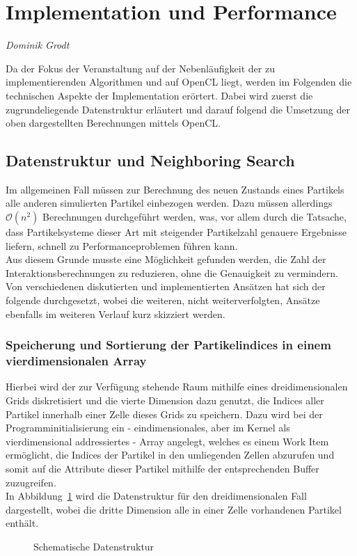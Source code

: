 \section{Implementation und Performance}


\begin{center}
\emph{{\small Dominik Grodt}}
\end{center}

\bigskip

Da der Fokus der Veranstaltung auf der Nebenläufigkeit der zu implementierenden Algorithmen und auf OpenCL liegt, werden im Folgenden die technischen Aspekte der Implementation erörtert. Dabei wird zuerst die zugrundeliegende Datenstruktur erläutert und darauf folgend die Umsetzung der oben dargestellten Berechnungen mittels OpenCL.

\subsection{Datenstruktur und Neighboring Search}
Im allgemeinen Fall müssen zur Berechnung des neuen Zustands eines Partikels alle anderen simulierten Partikel einbezogen werden. Dazu müssen allerdings $\mathcal O(n^2)$ Berechnungen durchgeführt werden, was, vor allem durch die Tatsache, dass Partikelsysteme dieser Art mit steigender Partikelzahl genauere Ergebnisse liefern, schnell zu Performanceproblemen führen kann.\\
Aus diesem Grunde musste eine Möglichkeit gefunden werden, die Zahl der Interaktionsberechnungen zu reduzieren, ohne die Genauigkeit zu vermindern. Von verschiedenen diskutierten und implementierten Ansätzen hat sich der folgende durchgesetzt, wobei die weiteren, nicht weiterverfolgten, Ansätze ebenfalls im weiteren Verlauf kurz skizziert werden.
\subsubsection{Speicherung und Sortierung der Partikelindices in einem vierdimensionalen Array}
Hierbei wird der zur Verfügung stehende Raum mithilfe eines dreidimensionalen Grids diskretisiert und die vierte Dimension dazu genutzt, die Indices aller Partikel innerhalb einer Zelle dieses Grids zu speichern. Dazu wird bei der Programminitialisierung ein - eindimensionales, aber im Kernel als vierdimensional addressiertes - Array angelegt, welches es einem Work Item ermöglicht, die Indices der Partikel in den umliegenden Zellen abzurufen und somit auf die Attribute dieser Partikel mithilfe der entsprechenden Buffer zuzugreifen.\\
In Abbildung~\ref{fig:datenstruktur_grid} wird die Datenstruktur für den dreidimensionalen Fall dargestellt, wobei die dritte Dimension alle in einer Zelle vorhandenen Partikel enthält.\\
\begin{figure}[h]
  \centering
    
  \caption{Schematische Datenstruktur}
  \label{fig:datenstruktur_grid}
\end{figure}

